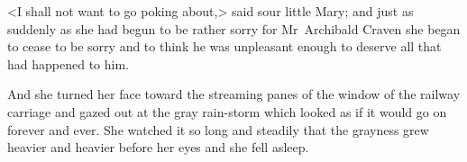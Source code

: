 <I shall not want to go poking about,> said sour little Mary; and just as suddenly as she had begun to be rather sorry for Mr~Archibald Craven she began to cease to be sorry and to think he was unpleasant enough to deserve all that had happened to him.

And she turned her face toward the streaming panes of the window of the railway carriage and gazed out at the gray rain-storm which looked as if it would go on forever and ever. She watched it so long and steadily that the grayness grew heavier and heavier before her eyes and she fell asleep.